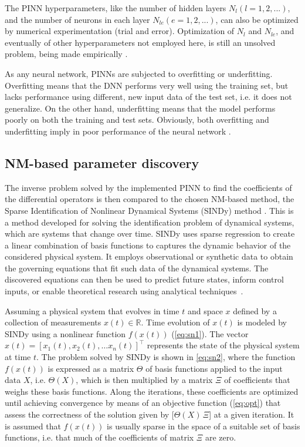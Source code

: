 \documentclass[conference]{IEEEtran}
\begin{document}
The PINN hyperparameters, like the number of hidden layers $N_l(l = 1, 2, ...)$, and the number of neurons in each layer $N_{le}(e = 1, 2, ...)$, can also be optimized by numerical experimentation (trial and error). Optimization of $N_l$ and $N_{le}$, and eventually of other hyperparameters not employed here, is still an unsolved problem, being made empirically \cite{Xu2022}.

As any neural network, PINNs are subjected to overfitting or underfitting. Overfitting means that the DNN performs very well using the training set, but lacks performance using different, new input data of the test set, i.e. it does not generalize. On the other hand, underfitting means that the model performs poorly on both the training and test sets. Obviously, both overfitting and underfitting imply in poor performance of the neural network \cite{Koehrsen2018}.

\subsection{NM-based parameter discovery}
\label{sec:npd}

The inverse problem solved by the implemented PINN to find the coefficients of the differential operators is then compared to the chosen NM-based method, the Sparse Identification of Nonlinear Dynamical Systems (SINDy) method \cite{Boninsegna2018}. This is a method developed for solving the identification problem of dynamical systems, which are systems that change over time. SINDy uses sparse regression to create a linear combination of basis functions to captures the dynamic behavior of the considered physical system. It employs observational or synthetic data to obtain the governing equations that fit such data of the dynamical systems. The discovered equations can then be used to predict future states, inform control inputs, or enable theoretical research using analytical techniques~\cite{Brunton2016}.

Assuming a physical system that evolves in time $t$ and space $x$ defined by a collection of measurements $x(t)\in \mathbb{R}$. Time evolution of $x(t)$ is modeled by SINDy using a nonlinear function $f(x(t))$ (\autoref{eq:sn1}). The vector $x(t)=[x_1(t), x_2(t), \dots x_n(t)]^\top$ represents the state of the physical system at time $t$. The problem solved by SINDy is shown in \autoref{eq:sn2}, where the function $f(x(t))$ is expressed as a matrix $\Theta$ of basis functions applied to the input data $X$, i.e. $\Theta(X)$, which is then multiplied by a matrix $\Xi$ of coefficients that weighs these basis functions. Along the iterations, these coefficients are optimized until achieving convergence by means of an objective function (\autoref{eq:opt}) that assess the correctness of the solution given by [$\Theta(X)\,\Xi$] at a given iteration. It is assumed that $f(x(t))$ is usually sparse in the space of a suitable set of basis functions, i.e. that much of the coefficients of matrix $\Xi$ are zero. 
\end{document}
